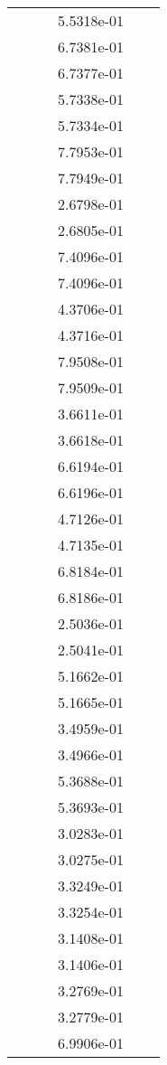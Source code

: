 \begin{xltabular}{\textwidth}{r|rS[table-format=1.3e+2]S[table-format=1.4e+2]S[table-format=1.4e+2]S[table-format=-1.5]}
&  &  & 5.5318e-01 & & \\
&  &  & 6.7381e-01 & & \\
&  &  & 6.7377e-01 & & \\
&  &  & 5.7338e-01 & & \\
&  &  & 5.7334e-01 & & \\
&  &  & 7.7953e-01 & & \\
&  &  & 7.7949e-01 & & \\
&  &  & 2.6798e-01 & & \\
&  &  & 2.6805e-01 & & \\
&  &  & 7.4096e-01 & & \\
&  &  & 7.4096e-01 & & \\
&  &  & 4.3706e-01 & & \\
&  &  & 4.3716e-01 & & \\
&  &  & 7.9508e-01 & & \\
&  &  & 7.9509e-01 & & \\
&  &  & 3.6611e-01 & & \\
&  &  & 3.6618e-01 & & \\
&  &  & 6.6194e-01 & & \\
&  &  & 6.6196e-01 & & \\
&  &  & 4.7126e-01 & & \\
&  &  & 4.7135e-01 & & \\
&  &  & 6.8184e-01 & & \\
&  &  & 6.8186e-01 & & \\
&  &  & 2.5036e-01 & & \\
&  &  & 2.5041e-01 & & \\
&  &  & 5.1662e-01 & & \\
&  &  & 5.1665e-01 & & \\
&  &  & 3.4959e-01 & & \\
&  &  & 3.4966e-01 & & \\
&  &  & 5.3688e-01 & & \\
&  &  & 5.3693e-01 & & \\
&  &  & 3.0283e-01 & & \\
&  &  & 3.0275e-01 & & \\
&  &  & 3.3249e-01 & & \\
&  &  & 3.3254e-01 & & \\
&  &  & 3.1408e-01 & & \\
&  &  & 3.1406e-01 & & \\
&  &  & 3.2769e-01 & & \\
&  &  & 3.2779e-01 & & \\
&  &  & 6.9906e-01 & & \\

\end{xltabular}
